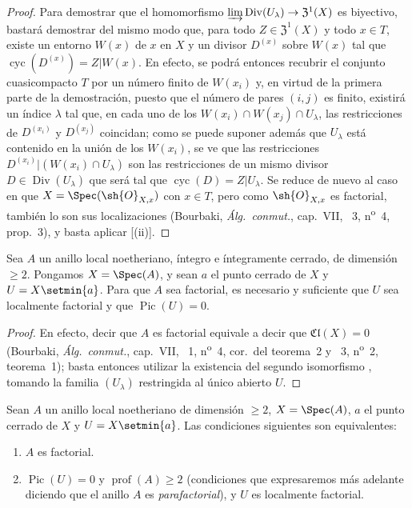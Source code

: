 \begin{proof}
Para demostrar que el homomorfismo $\varinjlim\operatorname{Div}(U_\lambda)\to\mathfrak{Z}^1(X)$ es biyectivo, bastará demostrar del mismo modo que, para todo $Z\in\mathfrak{Z}^1(X)$ y todo $x\in T$, existe un entorno $W(x)$ de $x$ en $X$ y un divisor $D^{(x)}$ sobre $W(x)$ tal que $\operatorname{cyc}(D^{(x)})=Z|W(x)$.
En efecto, se podrá entonces recubrir el conjunto cuasicompacto $T$ por un número finito de $W(x_i)$ y, en virtud de la primera parte de la demostración, puesto que el número de pares $(i,j)$ es finito, existirá un índice $\lambda$ tal que, en cada uno de los $W(x_i)\cap W(x_j)\cap U_\lambda$, las restricciones de $D^{(x_i)}$ y $D^{(x_j)}$ coincidan;
como se puede suponer además que $U_\lambda$ está contenido en la unión de los $W(x_i)$, se ve que las restricciones $D^{(x_i)}|(W(x_i)\cap U_\lambda)$ son las restricciones de un mismo divisor $D\in\operatorname{Div}(U_\lambda)$ que será tal que $\operatorname{cyc}(D)=Z|U_\lambda$.
Se reduce de nuevo al caso en que $X=\Spec(\sh{O}_{X,x})$ con $x\in T$, pero como $\sh{O}_{X,x}$ es factorial, también lo son sus localizaciones (Bourbaki, \emph{Álg.\ conmut.}, cap.~VII, \textsection~3, n\textsuperscript{o}~4, prop.~3), y basta aplicar [(ii)].
\end{proof}

\begin{corollary}[21.6.13]
\label{IV.21.6.13}
Sea $A$ un anillo local noetheriano, íntegro e íntegramente cerrado, de dimensión $\geq2$.
Pongamos $X=\Spec(A)$, y sean $a$ el punto cerrado de $X$ y $U=X\setmin\{a\}$.
Para que $A$ sea factorial, es necesario y suficiente que $U$ sea localmente factorial y que $\operatorname{Pic}(U)=0$.
\end{corollary}

\begin{proof}
En efecto, decir que $A$ es factorial equivale a decir que $\mathfrak{Cl}(X)=0$ (Bourbaki, \emph{Álg.\ conmut.}, cap.~VII, \textsection~1, n\textsuperscript{o}~4, cor.\ del teorema~2 y \textsection~3, n\textsuperscript{o}~2, teorema~1);
basta entonces utilizar la existencia del segundo isomorfismo , tomando la familia $(U_\lambda)$ restringida al único abierto $U$.
\end{proof}

\begin{corollary}[21.6.14]
\label{IV.21.6.14}
Sean $A$ un anillo local noetheriano de dimensión $\geq2$, $X=\Spec(A)$, $a$ el punto cerrado de $X$ y $U=X\setmin\{a\}$.
Las condiciones siguientes son equivalentes:
\begin{enumerate}[label=\emph{\alph*)}]
  \item $A$ es factorial.
  \item $\operatorname{Pic}(U)=0$ y $\operatorname{prof}(A)\geq2$ \textup{(condiciones que expresaremos más adelante  diciendo que el anillo $A$ es \emph{parafactorial})}, y $U$ es localmente factorial.
\end{enumerate}
\end{corollary}

